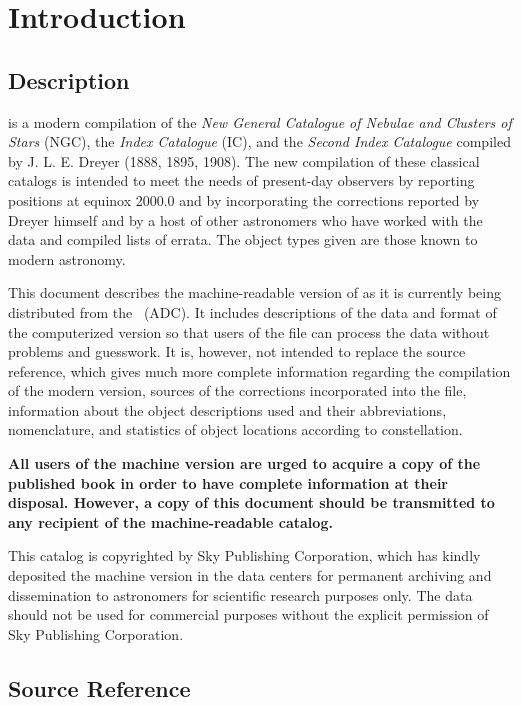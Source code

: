\section{Introduction}

\subsection{Description}

{\em \cat} is a modern compilation of the {\em New General Catalogue of Nebulae
and Clusters of Stars} (NGC), the {\em Index Catalogue} (IC), and the {\em
Second Index Catalogue} compiled by J. L. E. Dreyer (1888, 1895, 1908). The new
compilation of these classical catalogs is intended to meet the needs of
present-day observers by reporting positions at equinox 2000.0 and by
incorporating the corrections reported by Dreyer himself and by a host of other
astronomers who have worked with the data and compiled lists of errata. The
object types given are those known to modern astronomy.

This document describes the machine-readable version of {\em \cat} as it is
currently being distributed from the \adc\ (ADC). It includes descriptions of
the data and format of the computerized version so that users of the file can
process the data without problems and guesswork. It is, however, not intended to
replace the source reference, which gives much more complete information
regarding the compilation of the modern version, sources of the corrections
incorporated into the file, information about the object descriptions used and
their abbreviations, nomenclature, and statistics of object locations according
to constellation.

{\bf All users of the machine version are urged to acquire a copy of the
published book in order to have complete information at their disposal. However,
a copy of this document should be transmitted to any recipient of the
machine-readable catalog.}

{\bfit This catalog is copyrighted by Sky Publishing Corporation, which has
kindly deposited the machine version in the data centers for permanent archiving
and dissemination to astronomers for scientific research purposes only. The data
should not be used for commercial purposes without the explicit permission of
Sky Publishing Corporation.}

\subsection{Source Reference}


